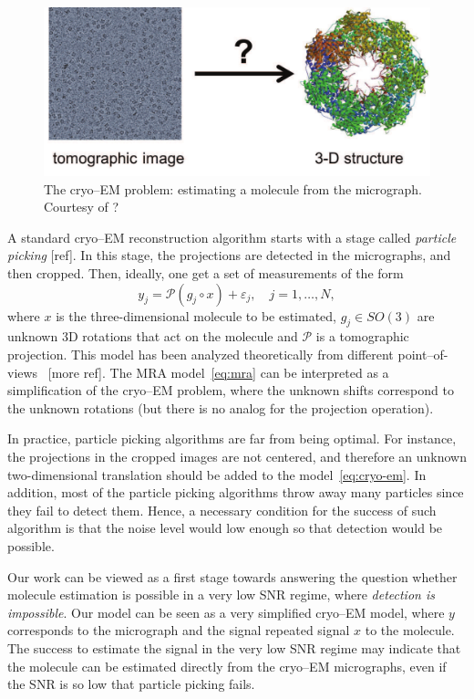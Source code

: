 \documentclass[journal]{IEEEtran}
\numberwithin{equation}{section}
\numberwithin{figure}{section}
\theoremstyle{plain}
\theoremstyle{definition}
\theoremstyle{remark}
\theoremstyle{plain}
\theoremstyle{remark}
\theoremstyle{plain}
\theoremstyle{plain}
\begin{document}
\begin{figure}
	\begin{center}
		\includegraphics[scale = .35]{cryoem-problem-eps-converted-to}		
	\end{center}
	\caption{The cryo--EM problem: estimating a molecule from the micrograph. Courtesy of ?}
	\label{fig:cryo-EM-problem}
\end{figure}

A standard cryo--EM reconstruction algorithm starts with a stage called \emph{particle picking} [ref]. In this stage, the projections are detected in the micrographs, and then cropped. Then, ideally, one get a set of measurements of the form 
\begin{equation} \label{eq:cryo-em}
y_j = \mathcal{P}( g_j\circ x) + \varepsilon_j,\quad j=1,\ldots,N, 
\end{equation}
where $x$ is the three-dimensional molecule to be estimated,  $g_j\in SO(3)$ are unknown 3D rotations that act on the molecule and $\mathcal{P}$ is a tomographic projection. This model has been analyzed theoretically from different point--of-views~\cite{bandeira2015non,hadani2011representation} [more ref]. The MRA model~\ref{eq:mra} can be interpreted as a simplification of the cryo--EM problem, where the unknown shifts correspond to the unknown rotations (but there is no analog for the projection operation).

In practice, particle picking algorithms are far from being optimal. For instance, the projections in the cropped images are not centered, and therefore an unknown  two-dimensional translation should be added to the model~\eqref{eq:cryo-em}. In addition, most of the particle picking algorithms throw away many particles since they fail to detect them. Hence, a necessary condition for the success of such algorithm is that the noise level would low enough so that detection would be possible.

Our work can be viewed as a first stage towards answering the question whether molecule estimation is possible in a very low SNR regime, where \emph{detection is impossible}. Our model can be seen as a very simplified cryo--EM model, where $y$ corresponds to the micrograph and the signal repeated signal $x$ to the molecule. The success to estimate the signal in the very low SNR regime may indicate that the molecule can be estimated directly from the cryo--EM micrographs, even if the SNR is so low that particle picking fails. 
\end{document}
